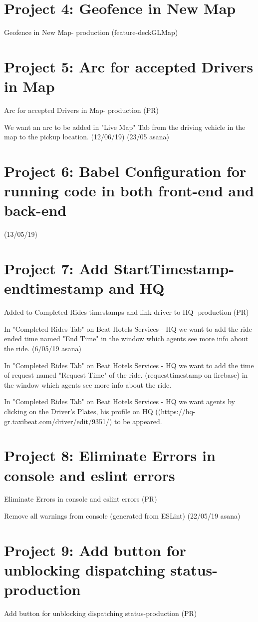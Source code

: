 \section{Project 4: Geofence in New Map}
Geofence in New Map- production (feature-deckGLMap)

\section{Project 5: Arc for accepted Drivers in Map}
Arc for accepted Drivers in Map- production (PR)

We want an arc to be added in "Live Map" Tab from the driving vehicle in the map to the pickup location. (12/06/19) (23/05 asana)

\section{Project 6: Babel Configuration for running code in both front-end and back-end}

(13/05/19)

\section{Project 7: Add StartTimestamp- endtimestamp and HQ}
Added to Completed Rides timestamps and link driver to HQ- production (PR)

In "Completed Rides Tab" on Beat Hotels Services - HQ we want to add  the ride ended time named "End Time" in the window which agents see more info about the ride. (6/05/19 asana)

In "Completed Rides Tab" on Beat Hotels Services - HQ we want to add the time of request named "Request Time" of the ride. (requesttimestamp on firebase) in the window which agents see more info about the ride.

In "Completed Rides Tab" on Beat Hotels Services - HQ we want agents by clicking on the Driver's Plates, his profile on HQ ((https://hq-gr.taxibeat.com/driver/edit/9351/) to be appeared.

\section{Project 8: Eliminate Errors in console and eslint errors}
Eliminate Errors in console and eslint errors (PR)

Remove all warnings from console (generated from ESLint) (22/05/19 asana)

\section{Project 9: Add button for unblocking dispatching status-production}
Add button for unblocking dispatching status-production (PR)


